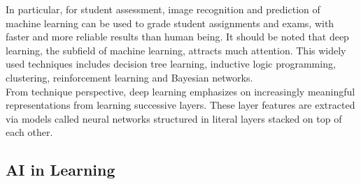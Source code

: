 \documentclass[conference]{IEEEtran}
\begin{document}
In particular, for student assessment, image recognition and prediction of machine learning can be used to grade student assignments and exams, with faster and more reliable results than human being. It should be noted that deep learning, the subfield of machine learning, attracts much attention. This widely used techniques includes decision tree learning, inductive logic programming, clustering, reinforcement learning and Bayesian networks. \\
From technique perspective, deep learning emphasizes on increasingly meaningful representations from learning successive layers. These layer features are extracted via models called neural networks structured in literal layers stacked on top of each other.

\subsection{AI in Learning}
\end{document}
